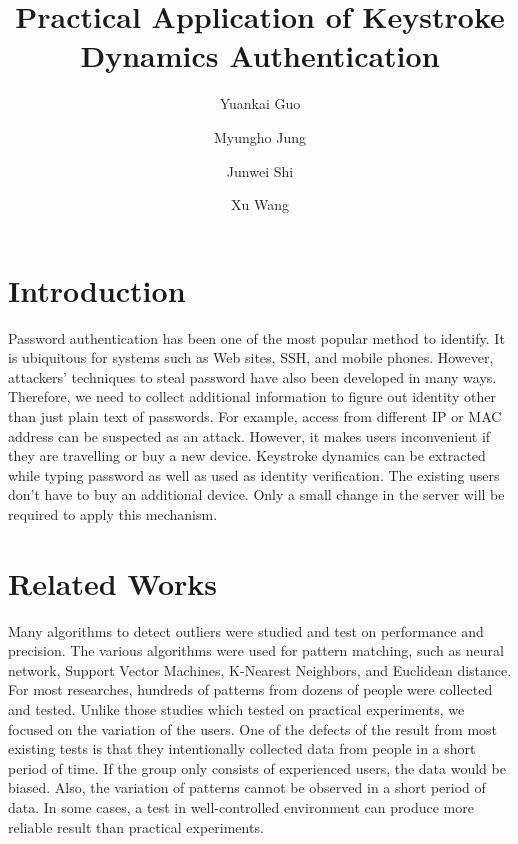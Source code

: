 \documentclass[twocolumn,showpacs,%
  nofootinbib,aps,%
  eqsecnum,prd,notitlepage,showkeys,10pt]{revtex4-1}
\begin{document}
\title{Practical Application of Keystroke Dynamics Authentication}

\author{Yuankai Guo}
\author{Myungho Jung}
\author{Junwei Shi}
\author{Xu Wang}


\maketitle

\section{Introduction}
Password authentication has been one of the most popular method to identify. It is ubiquitous for systems such as Web sites, SSH, and mobile phones. However, attackers' techniques to steal password have also been developed in many ways. Therefore, we need to collect additional information to figure out identity other than just plain text of passwords. For example, access from different IP or MAC address can be suspected as an attack. However, it makes users inconvenient if they are travelling or buy a new device. Keystroke dynamics can be extracted while typing password as well as used as identity verification\cite{gaines1980authentication}. The existing users don't have to buy an additional device. Only a small change in the server will be required to apply this mechanism.

\section{Related Works}
Many algorithms to detect outliers were studied and test on performance and precision\cite{shanmugapriya2009survey}. The various algorithms were used for pattern matching, such as neural network, Support Vector Machines, K-Nearest Neighbors, and Euclidean distance. For most researches, hundreds of patterns from dozens of people were collected and tested. Unlike those studies which tested on practical experiments, we focused on the variation of the users. One of the defects of the result from most existing tests is that they intentionally collected data from people in a short period of time. If the group only consists of experienced users, the data would be biased. Also, the variation of patterns cannot be observed in a short period of data. In some cases, a test in well-controlled environment can produce more reliable result than practical experiments.
\end{document}
